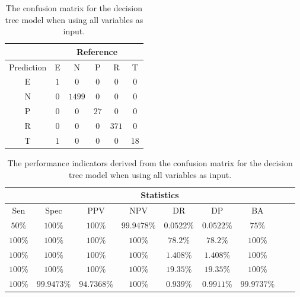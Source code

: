 \begin{table}[!ht]
	\centering
	\begin{tabular}{|c|c|c|c|c|c|}
		\hline
		 & \multicolumn{5}{|c|}{Reference} \\ \hline
		 Prediction & E & N & P & R & T \\ \hline
		 E & $1$ & $0$ & $0$ & $0$ & $0$ \\ \hline
		 N & $0$ & $1499$ & $0$ & $0$ & $0$ \\ \hline
		 P & $0$ & $0$ & $27$ & $0$ & $0$ \\ \hline
		 R & $0$ & $0$ & $0$ & $371$ & $0$ \\ \hline
		 T & $1$ & $0$ & $0$ & $0$ & $18$ \\ \hline
	\end{tabular}
	\caption{The confusion matrix for the decision tree model when using all variables as input.}
	\label{tab:cm:all:C5.0}
\end{table}

\begin{table}[!ht]
	\centering
	\begin{tabular}{|c|c|c|c|c|c|c|c|c|}
		\hline
		 & \multicolumn{7}{c|}{Statistics} \\ \hline
		Sen & Spec & PPV & NPV & DR & DP & BA \\ \hline
		$50\%$ & $100\%$ & $100\%$ & $99.9478\%$ & $0.0522\%$ & $0.0522\%$ & $75\%$ \\ \hline
		$100\%$ & $100\%$ & $100\%$ & $100\%$ & $78.2\%$ & $78.2\%$ & $100\%$ \\ \hline
		$100\%$ & $100\%$ & $100\%$ & $100\%$ & $1.408\%$ & $1.408\%$ & $100\%$ \\ \hline
		$100\%$ & $100\%$ & $100\%$ & $100\%$ & $19.35\%$ & $19.35\%$ & $100\%$ \\ \hline
		$100\%$ & $99.9473\%$ & $94.7368\%$ & $100\%$ & $0.939\%$ & $0.9911\%$ & $99.9737\%$ \\ \hline
	\end{tabular}
	\caption{The performance indicators derived from the confusion matrix for the decision tree model when using all variables as input.}
	\label{tab:cs:all:C5.0}
\end{table}

